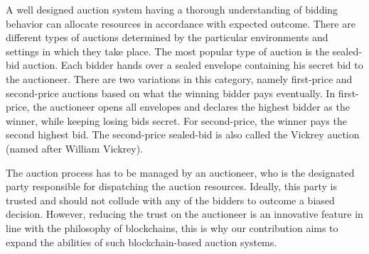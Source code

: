 A well designed auction system having a thorough understanding of bidding behavior can allocate resources in accordance with expected outcome. There are different types of auctions determined by the  particular environments and settings in which they take place. The most popular type of auction is the sealed-bid auction. Each bidder hands over a sealed envelope containing his secret bid to the auctioneer. There are two variations in this category, namely first-price and second-price auctions based on what the winning bidder pays eventually. In first-price, the auctioneer opens all envelopes and declares the highest bidder as the winner, while keeping losing bids secret. For second-price, the winner pays the second highest bid. The second-price sealed-bid is also called the Vickrey auction (named after William Vickrey). 
% 

The auction process has to be managed by an auctioneer, who is the designated party responsible for dispatching the auction resources. Ideally, this party is trusted and should not collude with any of the bidders to outcome a biased decision. However, reducing the trust on the auctioneer is an innovative feature in line with the philosophy of blockchains, this is why our contribution aims to expand the abilities of such blockchain-based auction systems.

